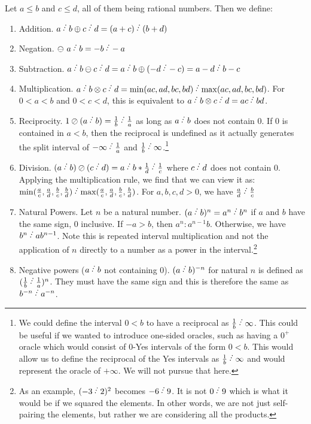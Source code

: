 \documentclass[12pt]{article}
\begin{document}
Let $a \leq b$ and $c \leq d$, all of them being rational numbers. Then we define:
\begin{enumerate}
    \item Addition. $a\lte b \oplus c\lte d = (a+c)\lte (b+d)$
    \item Negation. $\ominus\ a\lte b = -b\lte -a$
    \item Subtraction. $a\lte b \ominus c\lte d = a\lte b \oplus (-d\lte -c) = a-d\lte b-c$
    \item Multiplication. $a\lte b \otimes c\lte d = \min(ac, ad, bc, bd)\lte  \max(ac,ad,bc,bd)$. For $0<a<b$ and $0<c<d$, this is equivalent to $a\lte b \otimes c\lte d = ac\lte bd$. 
    \item Reciprocity. $1 \oslash (a\lte b) = \frac{1}{b}\lte \frac{1}{a}$ as long as $a\lte b$ does not contain 0. If 0 is contained in $a \lt b$, then the reciprocal is undefined as it actually generates the split interval of $-\infty\lte \frac{1}{a}$ and $\frac{1}{b}\lte \infty$.\footnote{We could define the interval $0 \lt b$ to have a reciprocal as $\frac{1}{b}\lte \infty$. This could be useful if we wanted to introduce one-sided oracles, such as having a $0^+$ oracle which would consist of $0$-Yes intervals of the form $0\lt b$. This would allow us to define the reciprocal of the Yes intervals as $\frac{1}{b}\lte \infty$ and would represent the oracle of $+ \infty$. We will not pursue that here.  }
    \item Division. $(a\lte b) \oslash (c\lte d) = a\lte b * \frac{1}{d}\lte \frac{1}{c}$ where $c\lte d$ does not contain 0. Applying the multiplication rule, we find that we can view it as:   $\min(\frac{a}{c}, \frac{a}{d}, \frac{b}{c}, \frac{b}{d})\lte  \max(\frac{a}{c},\frac{a}{d},\frac{b}{c},\frac{b}{d})$. For $a, b, c, d > 0$, we have $\frac{a}{d} \lte  \frac{b}{c}$
    \item Natural Powers. Let $n$ be a natural number. $(a\lte b)^n = a^n\lte b^n$ if $a$ and $b$ have the same sign, 0 inclusive. If $-a > b$, then $a^n : a^{n-1} b$. Otherwise, we have $b^n \lte a b^{n-1}$. Note this is repeated interval multiplication and not the application of $n$ directly to a number as a power in the interval.\footnote{ As an example, $(-3 \lte 2)^2$ becomes $-6\lte 9$. It is not $0\lte 9$ which is what it would be if we squared the elements. In other words, we are not just self-pairing the elements, but rather we are considering all the products. } 
    \item Negative powers ($a\lte b$ not containing 0). $(a\lte b)^{-n}$ for natural $n$ is defined as $(\frac{1}{b}\lte \frac{1}{a})^n$. They must have the same sign and this is therefore the same as $b^{-n} \lte  a^{-n}$.
\end{enumerate}
\end{document}
